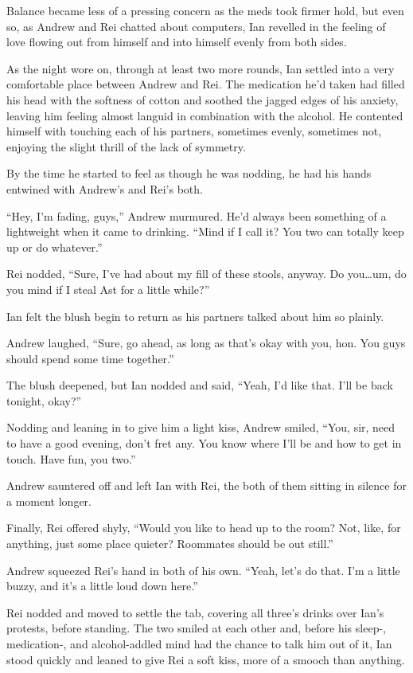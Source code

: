 Balance became less of a pressing concern as the meds took firmer hold, but even so, as Andrew and Rei chatted about computers, Ian revelled in the feeling of love flowing out from himself and into himself evenly from both sides.

\secdiv

As the night wore on, through at least two more rounds, Ian settled into a very comfortable place between Andrew and Rei. The medication he'd taken had filled his head with the softness of cotton and soothed the jagged edges of his anxiety, leaving him feeling almost languid in combination with the alcohol. He contented himself with touching each of his partners, sometimes evenly, sometimes not, enjoying the slight thrill of the lack of symmetry.

By the time he started to feel as though he was nodding, he had his hands entwined with Andrew's and Rei's both.

``Hey, I'm fading, guys,'' Andrew murmured. He'd always been something of a lightweight when it came to drinking. ``Mind if I call it? You two can totally keep up or do whatever.''

Rei nodded, ``Sure, I've had about my fill of these stools, anyway. Do you\ldots{}um, do you mind if I steal Ast for a little while?''

Ian felt the blush begin to return as his partners talked about him so plainly.

Andrew laughed, ``Sure, go ahead, as long as that's okay with you, hon. You guys should spend some time together.''

The blush deepened, but Ian nodded and said, ``Yeah, I'd like that. I'll be back tonight, okay?''

Nodding and leaning in to give him a light kiss, Andrew smiled, ``You, sir, need to have a good evening, don't fret any. You know where I'll be and how to get in touch. Have fun, you two.''

Andrew sauntered off and left Ian with Rei, the both of them sitting in silence for a moment longer.

Finally, Rei offered shyly, ``Would you like to head up to the room? Not, like, for anything, just some place quieter? Roommates should be out still.''

Andrew squeezed Rei's hand in both of his own. ``Yeah, let's do that. I'm a little buzzy, and it's a little loud down here.''

Rei nodded and moved to settle the tab, covering all three's drinks over Ian's protests, before standing. The two smiled at each other and, before his sleep-, medication-, and alcohol-addled mind had the chance to talk him out of it, Ian stood quickly and leaned to give Rei a soft kiss, more of a smooch than anything.


